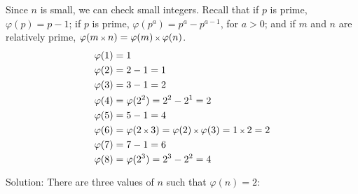 Since $n$ is small, we can check small integers. Recall that if $p$ is prime, $\varphi(p)=p-1$; if $p$ is prime, $\varphi(p^{a})=p^{a}-p^{a-1}$, for $a>0$; and if $m$ and $n$ are relatively prime, $\varphi(m \operatorname{\mbox{\scriptsize$\times$}} n)=\varphi(m)\operatorname{\mbox{\scriptsize$\times$}}\varphi(n)$.
\begin{align*}
\varphi(1) & = 1
\\
\varphi(2) & = 2-1 = 1
\\ 
\varphi(3) & = 3-1 = 2
\\ 
\varphi(4) & = \varphi(2^{2}) = 2^{2}-2^{1} = 2
\\ 
\varphi(5) & = 5-1 = 4
\\ 
\varphi(6) & = \varphi(2 \operatorname{\mbox{\scriptsize$\times$}} 3) = \varphi(2) \operatorname{\mbox{\scriptsize$\times$}} \varphi(3) = 1 \operatorname{\mbox{\scriptsize$\times$}} 2 = 2
\\
\varphi(7) & = 7-1 = 6
\\
\varphi(8) & = \varphi(2^{3}) = 2^{3}-2^{2} = 4
\end{align*}

Solution: There are three values of $n$ such that $\varphi(n)=2$: 
